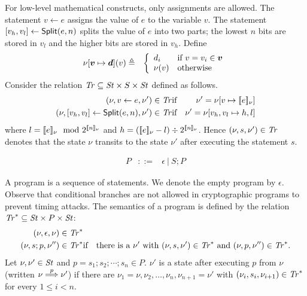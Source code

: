 For low-level mathematical constructs, only assignments are allowed.
The statement $v \leftarrow e$ assigns the value of $e$
to the variable $v$. The statement ${[}{v_h}, {v_l}{]} \leftarrow
\mbox{\textsf{Split}}(e, n)$ splits the value of $e$ into two parts;
the lowest $n$ bits are stored in $v_l$ and the higher bits
are stored in $v_h$. Define
\begin{eqnarray*}
\nu[\vv \mapsto \vd](v) & \defn &
\left\{
   \begin{array}{ll}
     d_i & \textmd{if $v = v_i \in \vv$}\\
     \nu(v) & \textmd{otherwise}
   \end{array}
\right.
\end{eqnarray*}
Consider the relation $\mathit{Tr} \subseteq \mathit{St} \times S \times \mathit{St}$ defined
as follows. 
\begin{eqnarray*}
  (\nu, v \leftarrow e, \nu') \in \mathit{Tr} & \textmd{if} &
  \nu' = \nu[v \mapsto [\![{e}]\!]_{\nu}]\\
  (\nu, {[}{v_h}, {v_l}{]} \leftarrow \mbox{\textsf{Split}} (e, n), \nu') \in
  \mathit{Tr} & \textmd{if} &
  \nu' = \nu[v_h, v_l \mapsto h, l]
\end{eqnarray*}
where
$l = [\![{e}]\!]_{\nu} \mod 2^{[\![{n}]\!]_{\nu}}$ and
$h = ([\![{e}]\!]_{\nu} - l) \div 2^{[\![{n}]\!]_{\nu}}$.
Hence $(\nu, s, \nu') \in \mathit{Tr}$ denotes that the state $\nu$ transits to 
the state $\nu'$ after executing the statement $s$.

\begin{eqnarray*}
  P & ::= & \epsilon \ |\ S; P
\end{eqnarray*}

A program is a sequence of statements. We denote the empty program by
$\epsilon$. Observe that conditional branches are not allowed in
cryptographic programs to prevent timing attacks. The semantics of a
program is defined by the relation 
$\mathit{Tr}^* \subseteq \mathit{St} \times P \times \mathit{St}$:
\begin{eqnarray*}
  (\nu, \epsilon, \nu) \in \mathit{Tr}^*\\
  (\nu, s; p, \nu'') \in \mathit{Tr}^* & \textmd{if} &
    \textmd{there is a } \nu' \textmd{ with }
    (\nu, s, \nu') \in \mathit{Tr}^* \textmd{ and }
    (\nu, p, \nu'') \in \mathit{Tr}^*.
\end{eqnarray*}
Let $\nu, \nu' \in \mathit{St}$ and $p = s_1; s_2; \cdots; s_n \in
P$. $\nu'$ is a state after executing $p$ from $\nu$
(written $\nu \overset{p}{\Longrightarrow} \nu'$) if there are $\nu_1 = \nu, \nu_2,
\ldots, \nu_n, \nu_{n+1} = \nu'$ with $(\nu_i, s_i, \nu_{i+1}) \in
\mathit{Tr}^*$ for every $1 \leq i < n$.

